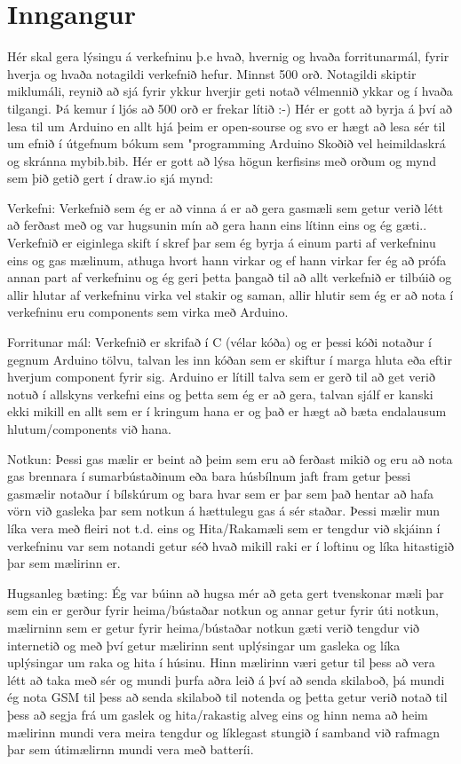 \section{Inngangur}
Hér skal gera lýsingu á verkefninu þ.e hvað,  hvernig og  hvaða forritunarmál, fyrir hverja og hvaða notagildi verkefnið hefur. Minnst 500 orð. Notagildi skiptir miklumáli, reynið að sjá fyrir ykkur hverjir geti notað vélmennið ykkar og í hvaða tilgangi.  Þá kemur í ljós að 500 orð er frekar lítið :-) Hér er gott að byrja á því að lesa til um Arduino en allt hjá þeim er open-sourse og svo er hægt að lesa sér til um efnið í útgefnum bókum sem "programming Arduino \cite{monk} Skoðið vel heimildaskrá og skránna mybib.bib. Hér er gott að lýsa högun kerfisins með orðum og mynd sem þið getið gert í draw.io sjá mynd: 

Verkefni: 
Verkefnið sem ég er að vinna á er að gera gasmæli sem getur verið létt að ferðast með og var hugsunin mín að gera hann eins lítinn eins og ég gæti.. Verkefnið er eiginlega skift í skref þar sem ég byrja á einum parti af verkefninu eins og gas mælinum, athuga hvort hann virkar og ef hann virkar fer ég að prófa annan part af verkefninu og ég geri þetta þangað til að allt verkefnið er tilbúið og allir hlutar af verkefninu virka vel stakir og saman, allir hlutir sem ég er að nota í verkefninu eru components sem virka með Arduino. 

Forritunar mál: 
Verkefnið er skrifað í C (vélar kóða) og er þessi kóði notaður í gegnum Arduino tölvu, talvan les inn kóðan sem er skiftur í marga hluta eða eftir hverjum component fyrir sig. Arduino er lítill talva sem er gerð til að get verið notuð í allskyns verkefni eins og þetta sem ég er að gera, talvan sjálf er kanski ekki mikill en allt sem er í kringum hana er og það er hægt að bæta endalausum hlutum/components við hana.

Notkun: 
Þessi gas mælir er beint að þeim sem eru að ferðast mikið og eru að nota gas brennara í sumarbústaðinum eða bara húsbílnum jaft fram getur þessi gasmælir notaður í bílskúrum og bara hvar sem er þar sem það hentar að hafa vörn við gasleka þar sem notkun á hættulegu gas á sér staðar. Þessi mælir mun líka vera með fleiri not t.d. eins og Hita/Rakamæli sem er tengdur við skjáinn í verkefninu var sem notandi getur séð hvað mikill raki er í loftinu og líka hitastigið þar sem mælirinn er.

Hugsanleg bæting:
Ég var búinn að hugsa mér að geta gert tvenskonar mæli þar sem ein er gerður fyrir heima/bústaðar notkun og annar getur fyrir úti notkun, mælirninn sem er getur fyrir heima/bústaðar notkun gæti verið tengdur við internetið og með því getur mælirinn sent uplýsingar um gasleka og líka uplýsingar um raka og hita í húsinu. Hinn mælirinn væri getur til þess að vera létt að taka með sér og mundi þurfa aðra leið á því að senda skilaboð, þá mundi ég nota GSM til þess að senda skilaboð til notenda og þetta getur verið notað til þess að segja frá um gaslek og hita/rakastig alveg eins og hinn nema að heim mælirinn mundi vera meira tengdur og líklegast stungið í samband við rafmagn þar sem útimælirnn mundi vera með batteríi.



\begin{figure}[h]
\end{figure}